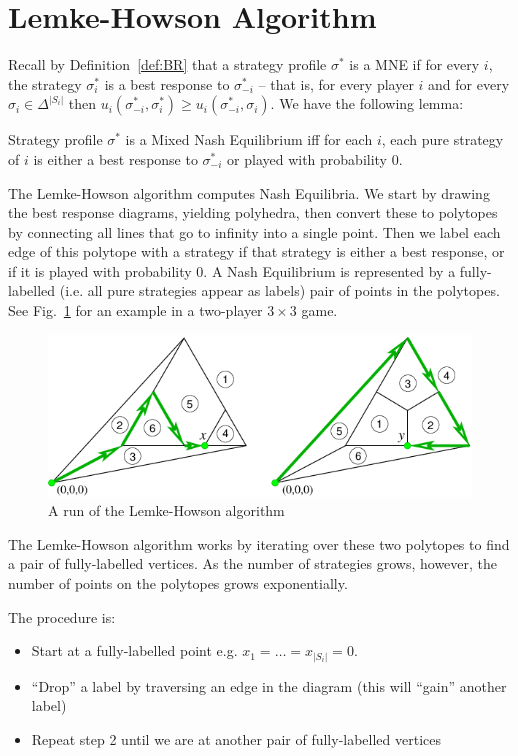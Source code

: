 \section{Lemke-Howson Algorithm}
	Recall by Definition~\ref{def:BR} that a strategy profile $\sigma^*$ is a
	MNE if for every $i$, the strategy $\sigma^*_i$ is a best response to
	$\sigma^*_{-i}$ -- that is, for every player $i$ and for every $\sigma_i
	\in \Delta^{|S_i|}$ then $u_i(\sigma^*_{-i}, \sigma^*_i) \ge
	u_i(\sigma^*_{-i}, \sigma_i)$. We have the following lemma:

	\begin{lemma}
		Strategy profile $\sigma^*$ is a Mixed Nash Equilibrium iff for each
		$i$, each pure strategy of $i$ is either a best response to
		$\sigma^*_{-i}$ or played with probability 0.
	\end{lemma}

	The Lemke-Howson algorithm computes Nash Equilibria. We start by drawing
	the best response diagrams, yielding polyhedra, then convert these to
	polytopes by connecting all lines that go to infinity into a single point.
	Then we label each edge of this polytope with a strategy if that strategy
	is either a best response, or if it is played with probability 0. A Nash
	Equilibrium is represented by a fully-labelled (i.e. all pure strategies
	appear as labels) pair of points in the polytopes. See
	Fig.~\ref{fig:polytopes} for an example in a two-player $3\times3$ game.

	\begin{figure}[h]
		\centering
		\includegraphics[width=.8\textwidth]{polytopes.png}
		\caption{A run of the Lemke-Howson algorithm}
		\label{fig:polytopes}
	\end{figure}

	The Lemke-Howson algorithm works by iterating over these two polytopes to
	find a pair of fully-labelled vertices. As the number of strategies grows,
	however, the number of points on the polytopes grows exponentially.

	The procedure is:
	\begin{itemize}
		\item Start at a fully-labelled point e.g. $x_1 = \ldots = x_{|S_i|} =
			0$.
		\item ``Drop'' a label by traversing an edge in the diagram (this will
			``gain'' another label)
		\item Repeat step 2 until we are at another pair of fully-labelled
			vertices
	\end{itemize}


